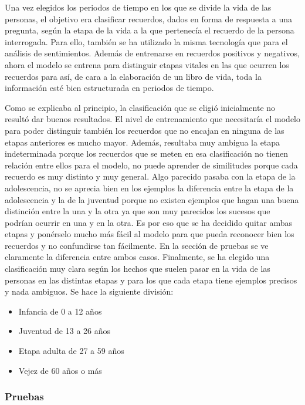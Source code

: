 Una vez elegidos los periodos de tiempo en los que se divide la vida de las personas, el objetivo era clasificar recuerdos, dados en forma de respuesta a una pregunta, según la etapa de la vida a la que pertenecía el recuerdo de la persona interrogada. Para ello, también se ha utilizado la misma tecnología que para el análisis de sentimientos. Además de entrenarse en recuerdos positivos y negativos, ahora el modelo se entrena para distinguir etapas vitales en las que ocurren los recuerdos para así, de cara a la elaboración de un libro de vida, toda la información esté bien estructurada en periodos de tiempo. 

Como se explicaba al principio, la clasificación que se eligió inicialmente no resultó dar buenos resultados. El nivel de entrenamiento que necesitaría el modelo para poder distinguir también los recuerdos que no encajan en ninguna de las etapas anteriores es mucho mayor. Además, resultaba muy ambigua la etapa indeterminada porque los recuerdos que se meten en esa clasificación no tienen relación entre ellos para el modelo, no puede aprender de similitudes porque cada recuerdo es muy distinto y muy general. Algo parecido pasaba con la etapa de la adolescencia, no se aprecia bien en los ejemplos la diferencia entre la etapa de la adolescencia y la de la juventud porque no existen ejemplos que hagan una buena distinción entre la una y la otra ya que son muy parecidos los sucesos que podrían ocurrir en una y en la otra. Es por eso que se ha decidido quitar ambas etapas y ponérselo mucho más fácil al modelo para que pueda reconocer bien los recuerdos y no confundirse tan fácilmente. En la sección de pruebas se ve claramente la diferencia entre ambos casos. Finalmente, se ha elegido una  clasificación muy clara según los hechos que suelen pasar en la vida de las personas en las distintas etapas y para los que cada etapa tiene ejemplos precisos y nada ambiguos. Se hace la siguiente división:

\begin{itemize}
	\item Infancia de 0 a 12 años
	\item Juventud de 13 a 26 años
	\item Etapa adulta de 27 a 59 años
	\item Vejez de 60 años o más
\end{itemize}


\subsubsection{Pruebas}

